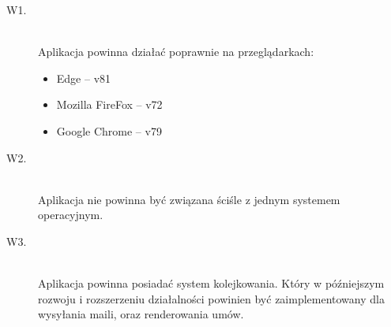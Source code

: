 \begin{description}
    \item[W1.] \hfill \\
    Aplikacja powinna działać poprawnie na przeglądarkach: 
    \begin{itemize}
        \item Edge – v81
        \item Mozilla FireFox – v72
        \item Google Chrome – v79
    \end{itemize}
    
    \item[W2.] \hfill \\
    Aplikacja nie powinna być związana ściśle z jednym systemem operacyjnym.
    
    \item[W3.] \hfill \\
    Aplikacja powinna posiadać system kolejkowania. Który w późniejszym rozwoju i rozszerzeniu działalności powinien być zaimplementowany dla wysyłania maili, oraz renderowania umów. 
\end{description}